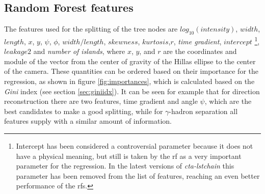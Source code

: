 \documentclass[main.tex]{subfiles}
\begin{document}
\subsection{Random Forest features} \label{sec:rffeatures}

The features used for the splitting of the tree nodes are $log_{10}(intensity)$, $width$, $length$, $x$, $y$, $\psi$, $\phi$, $width/length$, $skewness$, $kurtosis$,$r$, \textit{time gradient}, $intercept$ \footnote{Intercept has been considered a controversial parameter because it does not have a physical meaning, but still is taken by the \gls{rf} as a very important parameter for the regression. In the latest versions of \textit{cta-lstchain} this parameter has been removed from the list of features, reaching an even better performance of the \glspl{rf}.}, $leakage2$ and \textit{number of islands}, where $x$, $y$, and $r$ are the coordinates and module of the vector from the center of gravity of the Hillas ellipse to the center of the camera. These quantities can be ordered based on their importance for the regression, as shown in figure \ref{fig:importances}, which is calculated based on the \textit{Gini} index (see section \ref{sec:giniidx}). It can be seen for example that for direction reconstruction there are two features, time gradient and angle $\psi$, which are the best candidates to make a good splitting, while for $\gamma$-hadron separation all features supply with a similar amount of information. 
\end{document}
